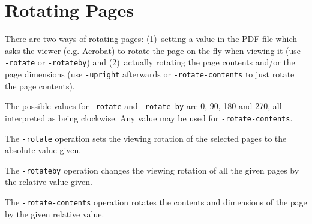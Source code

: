 \documentclass{book}
\begin{document}
\noindent{}

  \section{Rotating Pages}

There are two ways of rotating pages: (1)~setting a value in the PDF file which
asks the viewer (e.g. Acrobat) to rotate the page on-the-fly when viewing it
(use \texttt{-rotate} or \texttt{-rotateby}) and (2)~actually rotating the page
contents and/or the page dimensions (use \texttt{-upright} afterwards or
\texttt{-rotate-contents} to just rotate the page contents).

  The possible values for \texttt{-rotate} and \texttt{-rotate-by} are 0, 90,
180 and 270, all interpreted as being clockwise. Any value may be used for
\texttt{-rotate-contents}.
  
The \texttt{-rotate} operation sets the viewing rotation of the selected pages to
the absolute value given.

\noindent{}

  \noindent The \texttt{-rotateby} operation changes the viewing rotation of all the
given pages by the relative value given.

\noindent{}

  \noindent The \texttt{-rotate-contents} operation rotates the contents and dimensions
of the page by the given relative value.


\noindent{}
\end{document}
